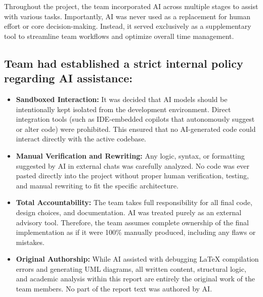 \noindent\hspace*{1cm} Throughout the project, the team incorporated AI across multiple stages to assist with various tasks. Importantly, AI was never used as a replacement for human effort or core decision-making. Instead, it served exclusively as a supplementary tool to streamline team workflows and optimize overall time management. 

\subsection*{Team had established a strict internal policy regarding AI assistance:}
\begin{itemize}
    \item \textbf{Sandboxed Interaction:} It was decided that AI models should be intentionally kept isolated from the development environment. Direct integration tools (such as IDE-embedded copilots that autonomously suggest or alter code) were prohibited. This ensured that no AI-generated code could interact directly with the active codebase.
    \item \textbf{Manual Verification and Rewriting:} Any logic, syntax, or formatting suggested by AI in external chats was carefully analyzed. No code was ever pasted directly into the project without proper human verification, testing, and manual rewriting to fit the specific architecture.
    \item \textbf{Total Accountability:} The team takes full responsibility for all final code, design choices, and documentation. AI was treated purely as an external advisory tool. Therefore, the team assumes complete ownership of the final implementation as if it were 100\% manually produced, including any flaws or mistakes.
    \item \textbf{Original Authorship:} While AI assisted with debugging LaTeX \cite{kopka2003guide} compilation errors and generating UML diagrams, all written content, structural logic, and academic analysis within this report are entirely the original work of the team members. No part of the report text was authored by AI.
\end{itemize}

